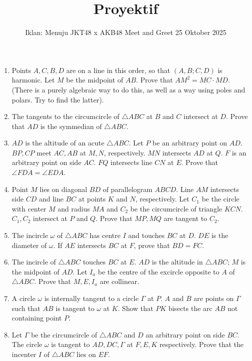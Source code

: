 \documentclass[12pt]{scrartcl}
\title{Proyektif}
\date{Iklan: Menuju JKT48 x AKB48 Meet and Greet 25 Oktober 2025}
\begin{document}
\renewcommand*\contentsname{Daftar Isi}
\tableofcontents

\newpage


\begin{enumerate}
    \item Points $A, C, B, D$ are on a line in this order, so that $(A,B;C,D)$ is harmonic. Let $M$ be the midpoint of $AB$. Prove that $AM^2 = MC \cdot MD$. (There is a purely algebraic way to do this, as well as a way using poles and polars. Try to find the latter).

    \item The tangents to the circumcircle of $\triangle ABC$ at $B$ and $C$ intersect at $D$. Prove that $AD$ is the symmedian of $\triangle ABC$.

    \item $AD$ is the altitude of an acute $\triangle ABC$. Let $P$ be an arbitrary point on $AD$. $BP, CP$ meet $AC, AB$ at $M, N$, respectively. $MN$ intersects $AD$ at $Q$. $F$ is an arbitrary point on side $AC$. $FQ$ intersects line $CN$ at $E$. Prove that $\angle FDA = \angle EDA$.

    \item Point $M$ lies on diagonal $BD$ of parallelogram $ABCD$. Line $AM$ intersects side $CD$ and line $BC$ at points $K$ and $N$, respectively. Let $C_1$ be the circle with center $M$ and radius $MA$ and $C_2$ be the circumcircle of triangle $KCN$. $C_1, C_2$ intersect at $P$ and $Q$. Prove that $MP, MQ$ are tangent to $C_2$.
    
    \item The incircle $\omega$ of $\triangle ABC$ has centre $I$ and touches $BC$ at $D$. $DE$ is the diameter of $\omega$. If $AE$ intersects $BC$ at $F$, prove that $BD=FC$.

    \item The incircle of $\triangle ABC$ touches $BC$ at $E$. $AD$ is the altitude in $\triangle ABC$; $M$ is the midpoint of $AD$. Let $I_a$ be the centre of the excircle opposite to $A$ of $\triangle ABC$. Prove that $M, E, I_a$ are collinear.

    \item A circle $\omega$ is internally tangent to a circle $\Gamma$ at $P$. $A$ and $B$ are points on $\Gamma$ such that $AB$ is tangent to $\omega$ at $K$. Show that $PK$ bisects the arc $AB$ not containing point $P$.

    \item Let $\Gamma$ be the circumcircle of $\triangle ABC$ and $D$ an arbitrary point on side $BC$. The circle $\omega$ is tangent to $AD, DC, \Gamma$ at $F, E, K$ respectively. Prove that the incenter $I$ of $\triangle ABC$ lies on $EF$.


\end{enumerate}
\end{document}
